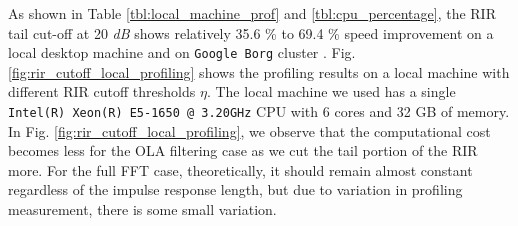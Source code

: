 \documentclass[a4paper]{article}
\begin{document}
As shown in Table \ref{tbl:local_machine_prof} and \ref{tbl:cpu_percentage},
the RIR tail cut-off at 20 \textit{dB} shows relatively 35.6 \% to 69.4 \%
speed improvement on a local desktop machine and on \texttt{Google Borg}
cluster \cite{A_Verma_eurosys_2015_1}.
Fig. \ref{fig:rir_cutoff_local_profiling} shows the profiling results
on a local machine with different RIR cutoff thresholds $\eta$.
The local machine we used has a single \texttt{Intel(R) Xeon(R) E5-1650 @ 3.20GHz}
CPU with 6 cores and 32 GB of memory. In Fig. \ref{fig:rir_cutoff_local_profiling},
we observe that the computational cost becomes less for the OLA filtering
case as we cut the tail portion of the RIR more. For the full FFT case,
theoretically, it should remain almost constant regardless of the
impulse response length, but due to variation
in profiling measurement, there is some small variation.
%
%
%
\end{document}
